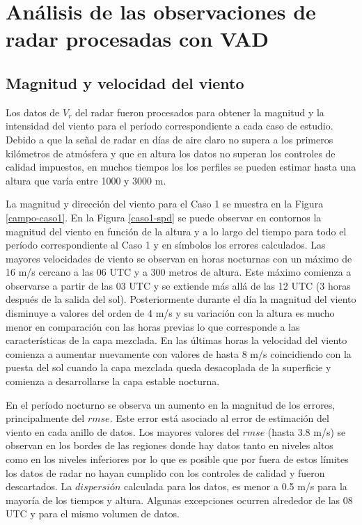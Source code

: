 \documentclass[12pt,spanish,oneside, a4paper]{book}
\begin{document}
\section{Análisis de las observaciones de radar procesadas con
VAD}\label{analisis-de-las-observaciones-de-radar-procesadas-con-vad}

\subsection{Magnitud y velocidad del
viento}\label{magnitud-y-velocidad-del-viento}

Los datos de \(V_r\) del radar fueron procesados para obtener la
magnitud y la intensidad del viento para el período correspondiente a
cada caso de estudio. Debido a que la señal de radar en días de aire
claro no supera a los primeros kilómetros de atmósfera y que en altura
los datos no superan los controles de calidad impuestos, en muchos
tiempos los los perfiles se pueden estimar hasta una altura que varía
entre 1000 y 3000 m.

La magnitud y dirección del viento para el Caso 1 se muestra en la
Figura \ref{campo-caso1}. En la Figura \ref{caso1-spd} se puede observar
en contornos la magnitud del viento en función de la altura y a lo largo
del tiempo para todo el período correspondiente al Caso 1 y en símbolos
los errores calculados. Las mayores velocidades de viento se observan en
horas nocturnas con un máximo de 16 m/s cercano a las 06 UTC y a 300
metros de altura. Este máximo comienza a observarse a partir de las 03
UTC y se extiende más allá de las 12 UTC (3 horas después de la salida
del sol). Posteriormente durante el día la magnitud del viento disminuye
a valores del orden de 4 m/s y su variación con la altura es mucho menor
en comparación con las horas previas lo que corresponde a las
características de la capa mezclada. En las últimas horas la velocidad
del viento comienza a aumentar nuevamente con valores de hasta 8 m/s
coincidiendo con la puesta del sol cuando la capa mezclada queda
desacoplada de la superficie y comienza a desarrollarse la capa estable
nocturna.

En el período nocturno se observa un aumento en la magnitud de los
errores, principalmente del \(rmse\). Este error está asociado al error
de estimación del viento en cada anillo de datos. Los mayores valores
del \(rmse\) (hasta 3.8 m/s) se observan en los bordes de las regiones
donde hay datos tanto en niveles altos como en los niveles inferiores
por lo que es posible que por fuera de estos límites los datos de radar
no hayan cumplido con los controles de calidad y fueron descartados. La
\(dispersión\) calculada para los datos, es menor a 0.5 m/s para la
mayoría de los tiempos y altura. Algunas excepciones ocurren alrededor
de las 08 UTC y para el mismo volumen de datos.
\end{document}

